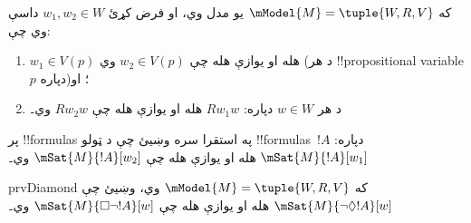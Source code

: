 \documentclass[../../../include/open-logic-section]{subfiles}
\begin{document}
\begin{prob}
  که $\mModel{M} = \tuple{W, R, V}$ يو مدل وي، او فرض کړئ $w_1, w_2 \in
  W$ داسې وي چې:
  \begin{enumerate}
  \item $w_1 \in V(p)$ هله او يوازې هله چې $w_2 \in V(p)$ وي (د هر !!{propositional variable} $p$ دپاره)؛ او
  \item د هر $w \in W$ دپاره: $Rw_1w$ هله او يوازې هله چې $Rw_2w$ وي۔
  \end{enumerate}
  پر !!{formula}s په استقرا سره وښيئ چې د ټولو !!{formula}s~$!A$ دپاره:
  $\mSat{M}{!A}[w_1]$ هله او يوازې هله چې $\mSat{M}{!A}[w_2]$ وي۔
\end{prob}

\begin{probtag}{prvDiamond}
  که $\mModel{M} = \tuple{W, R, V}$ وي، وښيئ چې
  $\mSat{M}{\lnot\Diamond !A}[w]$ هله او يوازې هله چې
  $\mSat{M}{\Box\lnot!A}[w]$ وي۔
\end{probtag}
\end{document}
